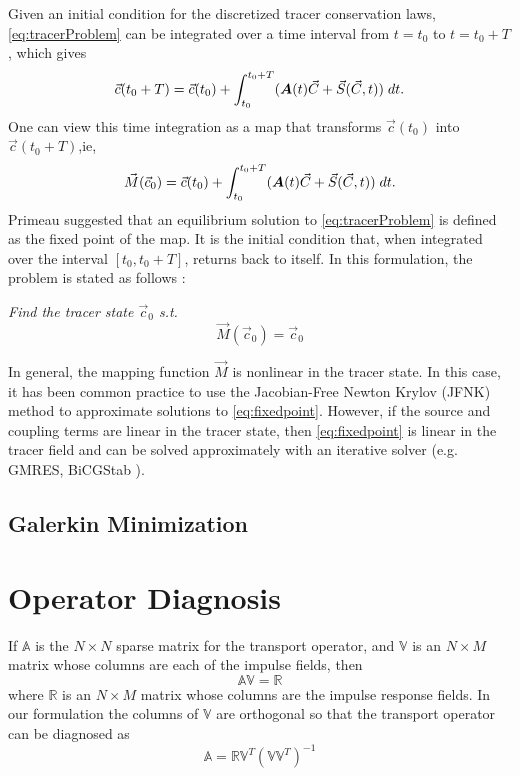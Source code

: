 \documentclass{softwaremanual}
\begin{document}
 Given an initial condition for the discretized tracer conservation laws, \eqref{eq:tracerProblem} can be integrated over a time interval from $t=t_0$ to $t=t_0+T$, which gives
 \begin{equation}
 \vec{c}(t_0 + T) = \vec{c}(t_0) + \int_{t_0}^{t_0+T} ( \boldsymbol{A}(t) \vec{C} + \vec{S}(\vec{C},t) ) \hspace{1mm} dt. \label{eq:integrated}
 \end{equation}
 One can view this time integration as a map that transforms $\vec{c}(t_0)$ into $\vec{c}(t_0+T)$,ie,
 \begin{equation}
 \vec{M}(\vec{c}_0) = \vec{c}(t_0) + \int_{t_0}^{t_0+T} ( \boldsymbol{A}(t) \vec{C} + \vec{S}(\vec{C},t) ) \hspace{1mm} dt.
 \end{equation}
Primeau suggested that an equilibrium solution to \eqref{eq:tracerProblem} is defined as the fixed point of the map. It is the initial condition that, when integrated over the interval $[t_0,t_0+T]$, returns back to itself. In this formulation, the problem is stated as follows :
\begin{center}
\textit{ Find the tracer state $\vec{c}_0$ s.t. }
\begin{equation}
\vec{M}(\vec{c}_0) = \vec{c}_0 \label{eq:fixedpoint}
\end{equation}
\end{center}
In general, the mapping function $\vec{M}$ is nonlinear in the tracer state. In this case, it has been common practice to use the Jacobian-Free Newton Krylov (JFNK) method to approximate solutions to \eqref{eq:fixedpoint}. However, if the source and coupling terms are linear in the tracer state, then \eqref{eq:fixedpoint} is linear in the tracer field and can be solved approximately with an iterative solver (e.g. GMRES, BiCGStab ).
\subsection{Galerkin Minimization}

\section{Operator Diagnosis}

 If $\mathbb{A}$ is the $N \times N$ sparse matrix for the transport operator, and $\mathbb{V}$ is an $N \times M$ matrix whose columns are each of the impulse fields, then
\begin{equation}
\mathbb{A}\mathbb{V} = \mathbb{R}
\end{equation}
where $\mathbb{R}$ is an $N\times M$ matrix whose columns are the impulse response fields. In our formulation the columns of $\mathbb{V}$ are orthogonal so that the transport operator can be diagnosed as
\begin{equation}
\mathbb{A} = \mathbb{R} \mathbb{V}^T ( \mathbb{V}\mathbb{V}^T )^{-1}
\end{equation}
\end{document}
